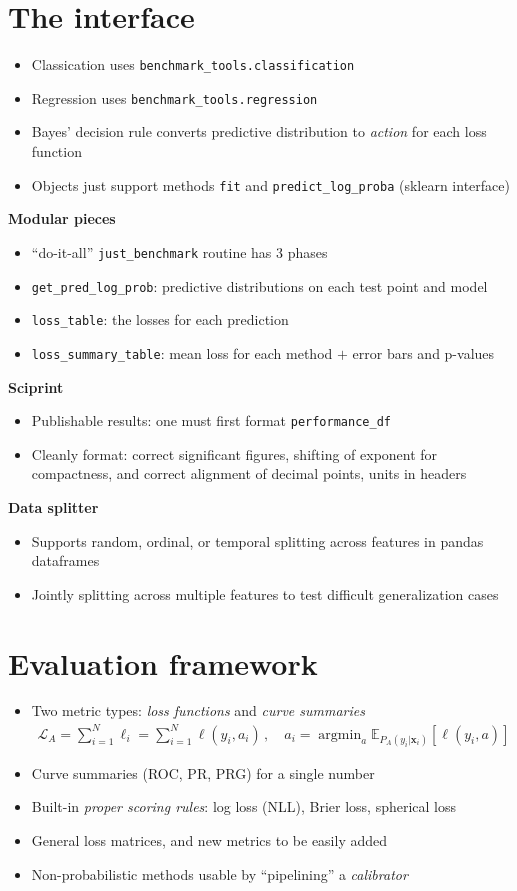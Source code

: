 \documentclass[a0,landscape]{a0poster}
\newcommand{\mysection}[1]{\section*{\fontsize{67.1}{82} \selectfont \color{NavyBlue} #1 \color{Black}}}
\renewcommand{\vec}[1]{{\boldsymbol{\mathbf{#1}}}} %
\newcommand{\E}{\mathbb{E}}
\newcommand{\Loss}{\mathcal{L}}
\newcommand{\loss}{\ell}
\DeclareMathOperator*{\argmin}{argmin}
\newcommand{\code}{\texttt}
\newcommand{\sectionx}{\textbf}
\begin{document}
\begin{multicols}{3}
\mysection{The interface}
%
\begin{itemize}
  \item Classication uses \code{benchmark\_tools.classification}
  \item Regression uses \code{benchmark\_tools.regression}
  \item Bayes' decision rule converts predictive distribution to \emph{action} for each loss function
  \item Objects just support methods \code{fit} and \code{predict\_log\_proba} (sklearn interface)
\end{itemize}
%
\sectionx{Modular pieces}
\begin{itemize}
  \item ``do-it-all'' \code{just\_benchmark} routine has 3 phases
  \item \code{get\_pred\_log\_prob}: predictive distributions on each test point and model
  \item \code{loss\_table}: the losses for each prediction
  \item \code{loss\_summary\_table}: mean loss for each method $+$ error bars and p-values
\end{itemize}
%
\sectionx{Sciprint}
\begin{itemize}
  \item Publishable results: one must first format \code{performance\_df}
  \item Cleanly format: correct significant figures, shifting of exponent for compactness, and correct alignment of decimal points, units in headers
\end{itemize}
%
\sectionx{Data splitter}
\begin{itemize}
  \item Supports random, ordinal, or temporal splitting across features in pandas dataframes
  \item Jointly splitting across multiple features to test difficult generalization cases
\end{itemize}

\columnbreak

\mysection{Evaluation framework}

\begin{itemize}
  \item Two metric types: \emph{loss functions} and \emph{curve summaries}
  \begin{align}
    \Loss_A = \sum_{i=1}^N \loss_i = \sum_{i=1}^N \loss(y_i, a_i)\,, \quad a_i = \argmin_a \E_{P_A(y_i|\vec x_i)}[\loss(y_i, a)]
  \end{align}
  \item Curve summaries (ROC, PR, PRG) for a single number
  \item Built-in \emph{proper scoring rules}: log loss (NLL), Brier loss, spherical loss
  \item General loss matrices, and new metrics to be easily added
  \item Non-probabilistic methods usable by ``pipelining'' a \emph{calibrator}
\end{itemize}


\end{multicols}
\end{document}
